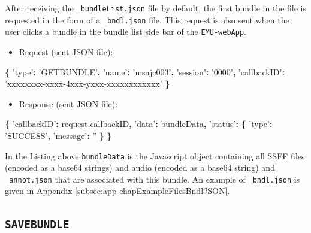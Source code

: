 \documentclass[]{book}
\newenvironment{Shaded}{\begin{snugshade}}{\end{snugshade}}
\newcommand{\AttributeTok}[1]{\textcolor[rgb]{0.77,0.63,0.00}{#1}}
\newcommand{\NormalTok}[1]{#1}
\newcommand{\OperatorTok}[1]{\textcolor[rgb]{0.81,0.36,0.00}{\textbf{#1}}}
\newcommand{\StringTok}[1]{\textcolor[rgb]{0.31,0.60,0.02}{#1}}
\newcommand{\VariableTok}[1]{\textcolor[rgb]{0.00,0.00,0.00}{#1}}
\providecommand{\tightlist}{%
  \setlength{\itemsep}{0pt}\setlength{\parskip}{0pt}}
\begin{document}
After receiving the \texttt{\_bundleList.json} file by default, the first bundle in the file is requested in the form of a \texttt{\_bndl.json} file. This request is also sent when the user clicks a bundle in the bundle list side bar of the \texttt{EMU-webApp}.

\begin{itemize}
\tightlist
\item
  Request (sent JSON file):
\end{itemize}

\begin{Shaded}
\begin{Highlighting}[]
\OperatorTok{\{}
  \StringTok{'type'}\OperatorTok{:} \StringTok{'GETBUNDLE'}\OperatorTok{,}
  \StringTok{'name'}\OperatorTok{:} \StringTok{'msajc003'}\OperatorTok{,}
  \StringTok{'session'}\OperatorTok{:} \StringTok{'0000'}\OperatorTok{,}
  \StringTok{'callbackID'}\OperatorTok{:} \StringTok{'xxxxxxxx-xxxx-4xxx-yxxx-xxxxxxxxxxxx'}
\OperatorTok{\}}
\end{Highlighting}
\end{Shaded}

\begin{itemize}
\tightlist
\item
  Response (sent JSON file):
\end{itemize}

\begin{Shaded}
\begin{Highlighting}[]
\OperatorTok{\{}
  \StringTok{'callbackID'}\OperatorTok{:} \VariableTok{request}\NormalTok{.}\AttributeTok{callbackID}\OperatorTok{,}
  \StringTok{'data'}\OperatorTok{:}\NormalTok{ bundleData}\OperatorTok{,}
  \StringTok{'status'}\OperatorTok{:} \OperatorTok{\{}
    \StringTok{'type'}\OperatorTok{:} \StringTok{'SUCCESS'}\OperatorTok{,}
    \StringTok{'message'}\OperatorTok{:} \StringTok{''}
  \OperatorTok{\}}
\OperatorTok{\}}
\end{Highlighting}
\end{Shaded}

In the Listing above \texttt{bundleData} is the Javascript object containing all SSFF files (encoded as a base64 strings) and audio (encoded as a base64 string) and \texttt{\_annot.json} that are associated with this bundle. An example of \texttt{\_bndl.json} is given in Appendix \ref{subsec:app-chapExampleFilesBndlJSON}.

\hypertarget{savebundle}{%
\subsection{\texorpdfstring{\texttt{SAVEBUNDLE}}{SAVEBUNDLE}}\label{savebundle}}
\end{document}
